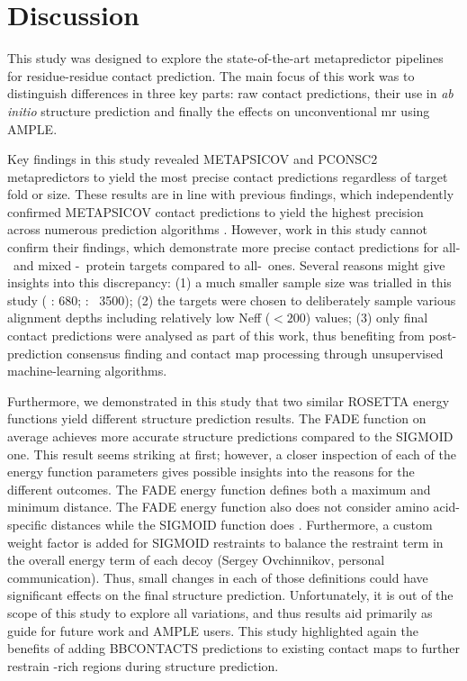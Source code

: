 \section{Discussion}
This study was designed to explore the state-of-the-art metapredictor pipelines for residue-residue contact prediction. The main focus of this work was to distinguish differences in three key parts: raw contact predictions, their use in  \textit{ab initio} structure prediction and finally the effects on unconventional \gls{mr} using AMPLE.

Key findings in this study revealed METAPSICOV and PCONSC2 metapredictors to yield the most precise contact predictions regardless of target fold or size. These results are in line with previous findings, which independently confirmed METAPSICOV contact predictions to yield the highest precision across numerous prediction algorithms \cite{Wuyun2016-hh, De_Oliveira2017-gj}. However, work in this study cannot confirm their findings, which demonstrate more precise contact predictions for all-\textbeta\ and mixed \textalpha-\textbeta\ protein targets compared to all-\textalpha\ ones. Several reasons might give insights into this discrepancy: (1) a much smaller sample size was trialled in this study ( \textcite{Wuyun2016-hh}: 680; \textcite{De_Oliveira2017-gj}: ~3500); (2) the targets were chosen to deliberately sample various alignment depths including relatively low Neff ($<200$) values; (3) only final contact predictions were analysed as part of this work, thus benefiting from post-prediction consensus finding and contact map processing through unsupervised machine-learning algorithms.

Furthermore, we demonstrated in this study that two similar ROSETTA energy functions yield different structure prediction results. The FADE function on average achieves more accurate structure predictions compared to the SIGMOID one. This result seems striking at first; however, a closer inspection of each of the energy function parameters gives possible insights into the reasons for the different outcomes. The FADE energy function defines both a maximum and minimum distance. The FADE energy function also does not consider amino acid-specific distances while the SIGMOID function does \cite{Kamisetty2013-le}. Furthermore, a custom weight factor is added for SIGMOID restraints to balance the restraint term in the overall energy term of each decoy (Sergey Ovchinnikov, personal communication). Thus, small changes in each of those definitions could have significant effects on the final structure prediction. Unfortunately, it is out of the scope of this study to explore all variations, and thus results aid primarily as guide for future work and AMPLE users. This study highlighted again the benefits of adding BBCONTACTS predictions to existing contact maps to further restrain \textbeta-rich regions during structure prediction. 

